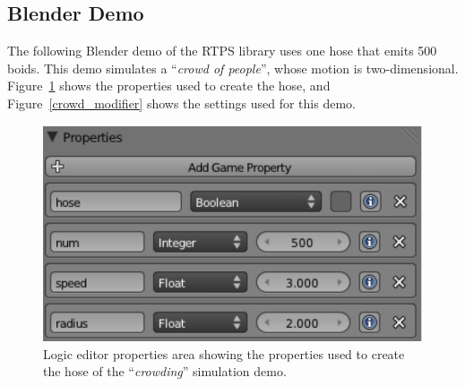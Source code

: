 \subsection{Blender Demo}

The following Blender demo of the RTPS library uses one hose that emits 500 boids. This demo simulates a ``\textit{crowd of people}'', whose motion is two-dimensional. Figure~\ref{crowd_prop} shows the properties used to create the hose, and Figure~\ref{crowd_modifier} shows the settings used for this demo. 

\begin{figure}[htbp]
\begin{center}
\includegraphics[scale=0.7]{figures/demo_crowds_prop.pdf}
\caption{Logic editor properties area showing the properties used to create the hose of the ``\textit{crowding}'' simulation demo.}
\label{crowd_prop}
\end{center}
\end{figure}

